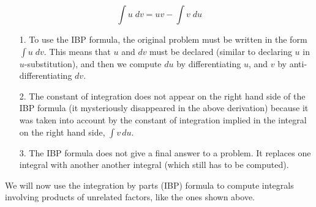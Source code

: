\documentclass[handout]{ximera}
\begin{document}
\begin{theorem}
\[
\int u \; dv = uv - \int v \; du
\]
\end{theorem}

\begin{remark}
\begin{enumerate}
\item[1.] To use the IBP formula, the original problem must be written in the form $\int u \; dv$. This means that $u$ and $dv$
must be declared (similar to declaring $u$ in $u$-substitution), and then we compute $du$ by differentiating $u$, and $v$ by anti-differentiating $dv$.
\item[2.] The constant of integration does not appear on the right hand side of the IBP formula
(it mysteriously disappeared in the above derivation) because it was taken into account by the constant of integration implied in 
the integral on the right hand side, $\int v \,du$.
\item[3.] The IBP formula does not give a final answer to a problem. 
It replaces one integral with another another integral (which still has to be computed).
\end{enumerate}
\end{remark}

We will now use the integration by parts (IBP) formula to compute integrals involving products of unrelated factors, like the ones
shown above. 
\end{document}
